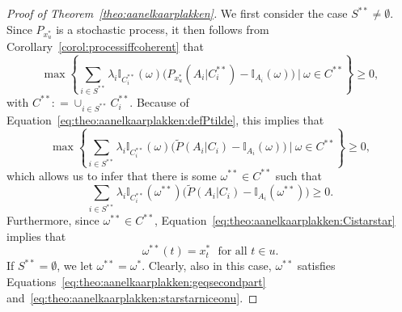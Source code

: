 \documentclass[10pt]{paper}
\theoremstyle{definition}
\newcommand{\ind}[1]{\mathbb{I}_{#1}}
\newcommand{\coloneqq}{:\!=}
\begin{document}
\begin{proof}[Proof of Theorem~\ref{theo:aanelkaarplakken}]
We first consider the case $S^{**}\neq\emptyset$. Since $P_{x_u^*}$ is a stochastic process, it then follows from Corollary~\ref{corol:processiffcoherent} that
\begin{equation*}%
\max\left\{\sum_{i\in S^{**}}\lambda_i\ind{C_i^{**}}(\omega)\bigl(P_{x_u^*}(A_i\vert C_i^{**})-\ind{A_i}(\omega)\bigr)~\Bigg\vert~\omega\in C^{**}\right\}\geq0,
\end{equation*}
with $C^{**}\coloneqq\cup_{i\in S^{**}}C_i^{**}$. Because of Equation~\eqref{eq:theo:aanelkaarplakken:defPtilde}, this implies that
\begin{equation*}%
\max\left\{\sum_{i\in S^{**}}\lambda_i\ind{C_i^{**}}(\omega)\bigl(\tilde{P}(A_i\vert C_i)-\ind{A_i}(\omega)\bigr)~\Bigg\vert~\omega\in C^{**}\right\}\geq0,
\end{equation*}
which allows us to infer that there is some $\omega^{**}\in C^{**}$ such that
\begin{equation}\label{eq:theo:aanelkaarplakken:geqsecondpart}
\sum_{i\in S^{**}}\lambda_i\ind{C_i^{**}}(\omega^{**})\bigl(\tilde{P}(A_i\vert C_i)-\ind{A_i}(\omega^{**})\bigr)\geq0.
\end{equation}
Furthermore, since $\omega^{**}\in C^{**}$, Equation~\eqref{eq:theo:aanelkaarplakken:Cistarstar} implies that
\begin{equation}\label{eq:theo:aanelkaarplakken:starstarniceonu}
\omega^{**}(t)=x_t^*
\text{~~for all $t\in u$.}
\end{equation}
If $S^{**}=\emptyset$, we let $\omega^{**}=\omega^{*}$. Clearly, also in this case, $\omega^{**}$ satisfies Equations~\eqref{eq:theo:aanelkaarplakken:geqsecondpart} and~\eqref{eq:theo:aanelkaarplakken:starstarniceonu}.


\end{proof}
\end{document}
